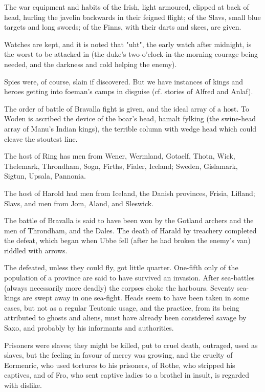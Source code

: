 \documentclass[10pt,a4paper]{report}
\begin{document}
The war equipment and habits of the Irish, light armoured, clipped at back of head, hurling the javelin backwards in their feigned flight; of the Slavs, small blue targets and long swords; of the Finns, with their darts and skees, are given.

Watches are kept, and it is noted that "uht", the early watch after midnight, is the worst to be attacked in (the duke's two-o'clock-in-the-morning courage being needed, and the darkness and cold helping the enemy).

Spies were, of course, slain if discovered. But we have instances of kings and heroes getting into foeman's camps in disguise (cf. stories of Alfred and Anlaf).

The order of battle of Bravalla fight is given, and the ideal array of a host. To Woden is ascribed the device of the boar's head, hamalt fylking (the swine-head array of Manu's Indian kings), the terrible column with wedge head which could cleave the stoutest line.

The host of Ring has men from Wener, Wermland, Gotaelf, Thotn, Wick, Thelemark, Throndham, Sogn, Firths, Fialer, Iceland; Sweden, Gislamark, Sigtun, Upsala, Pannonia.

The host of Harold had men from Iceland, the Danish provinces, Frisia, Lifland; Slavs, and men from Jom, Aland, and Sleswick.

The battle of Bravalla is said to have been won by the Gotland archers and the men of Throndham, and the Dales. The death of Harald by treachery completed the defeat, which began when Ubbe fell (after he had broken the enemy's van) riddled with arrows.

The defeated, unless they could fly, got little quarter. One-fifth only of the population of a province are said to have survived an invasion. After sea-battles (always necessarily more deadly) the corpses choke the harbours. Seventy sea-kings are swept away in one sea-fight. Heads seem to have been taken in some cases, but not as a regular Teutonic usage, and the practice, from its being attributed to ghosts and aliens, must have already been considered savage by Saxo, and probably by his informants and authorities.

Prisoners were slaves; they might be killed, put to cruel death, outraged, used as slaves, but the feeling in favour of mercy was growing, and the cruelty of Eormenric, who used tortures to his prisoners, of Rothe, who stripped his captives, and of Fro, who sent captive ladies to a brothel in insult, is regarded with dislike.
\end{document}
